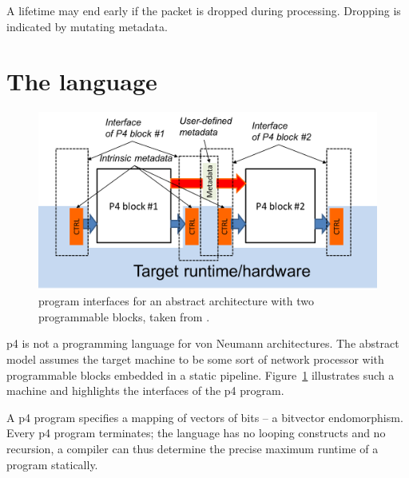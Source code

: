 A lifetime may end early if the packet is dropped during processing. Dropping is
indicated by mutating metadata.

\section{The \pfs language}

\begin{figure}[t]
	\includegraphics[width=1.00\textwidth]{resources/p4_16-architecture-model.png}

	\caption{\pfs program interfaces for an abstract architecture with two
	programmable blocks, taken from \cite{p416:v123:spec}.}
	\label{fig:arch-model}
\end{figure}

\acrshort{p4} is not a programming language for von Neumann architectures. The
abstract model assumes the target machine to be some sort of network processor
with programmable blocks embedded in a static pipeline.
Figure~\ref{fig:arch-model} illustrates such a machine and highlights the
interfaces of the \acrshort{p4} program.

A \acrshort{p4} program specifies a mapping of vectors of bits -- a bit\-vector
endomorphism. Every \acrshort{p4} program terminates; the language has no
looping constructs and no recursion, a compiler can thus determine the precise
maximum runtime of a program statically.


